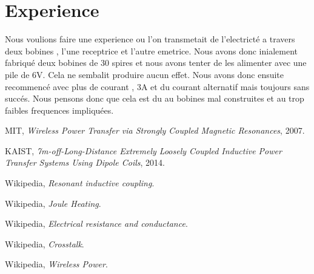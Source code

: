 \documentclass[12pt]{report}
\begin{document}
\section{Experience}
Nous voulions faire une experience ou l'on transmetait de l'electricté a travers deux bobines , l'une receptrice et l'autre emetrice. Nous avons donc inialement fabriqué deux bobines de 30 spires et nous avons tenter de les alimenter avec une pile de 6V. Cela ne sembalit produire aucun effet. Nous avons donc ensuite recommencé avec plus de courant , 3A et du courant alternatif mais toujours sans succés. Nous pensons donc que cela est du au bobines mal construites et au trop faibles frequences impliquées. 
  
\begin{thebibliography}{9}
    
  MIT,
  \emph{Wireless Power Transfer via Strongly Coupled Magnetic Resonances},
  2007.

  KAIST,
  \emph{7m-off-Long-Distance Extremely Loosely Coupled Inductive Power Transfer Systems Using Dipole Coils},
  2014.
  
  Wikipedia,
  \emph{Resonant inductive coupling}.
  
  Wikipedia,
  \emph{Joule Heating}.
  
  Wikipedia,
  \emph{Electrical resistance and conductance}.
  
  Wikipedia,
  \emph{Crosstalk}.
  
  Wikipedia,
  \emph{Wireless Power}.
  
\end{thebibliography}
\end{document}

